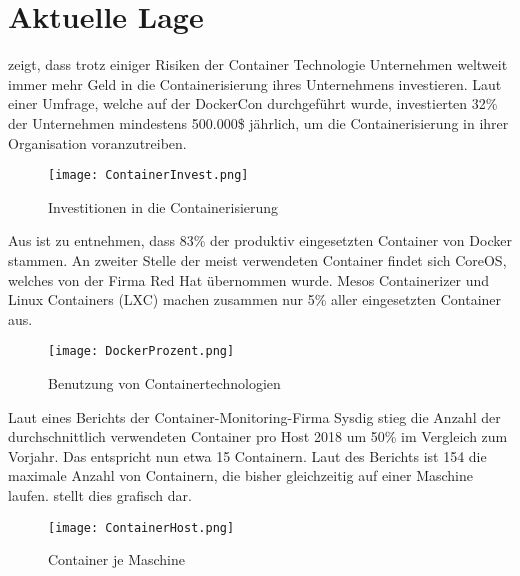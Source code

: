 \section{Aktuelle Lage}
\label{sec:AktuelleLage}
 zeigt, dass trotz einiger Risiken der Container Technologie Unternehmen weltweit immer mehr Geld in die Containerisierung ihres Unternehmens investieren. Laut einer Umfrage, welche auf der DockerCon durchgeführt wurde, investierten 32\% der Unternehmen mindestens 500.000\$ jährlich, um die Containerisierung in ihrer Organisation voranzutreiben. \cite{Investments}
\begin{figure}[H]
	\begin{center}
		\texttt{[image: ContainerInvest.png]}
	\end{center}
	\caption[Investitionen in die Containerisierung]{Investitionen in die Containerisierung \footnotemark}
	\label{fig:Stats1}
\end{figure}
\newpage
Aus  ist zu entnehmen, dass 83\% der produktiv eingesetzten Container von Docker stammen. An zweiter Stelle der meist verwendeten Container findet sich CoreOS, welches von der Firma Red Hat übernommen wurde. Mesos Containerizer und Linux Containers (LXC) machen zusammen nur 5\% aller eingesetzten Container aus.
\begin{figure}[H]
	\begin{center}
		\texttt{[image: DockerProzent.png]}
	\end{center}
	\caption[Benutzung von Containertechnologien]{Benutzung von Containertechnologien \footnotemark}
	\label{fig:Stats2}
\end{figure}
Laut eines Berichts der Container-Monitoring-Firma Sysdig stieg die Anzahl der durchschnittlich verwendeten Container pro Host 2018 um 50\% im Vergleich zum Vorjahr. Das entspricht nun etwa 15 Containern. Laut des Berichts ist 154 die maximale Anzahl von Containern, die bisher gleichzeitig auf einer Maschine laufen.  stellt dies grafisch dar.
\begin{figure}[H]
	\begin{center}
		\texttt{[image: ContainerHost.png]}
	\end{center}
	\caption[Container je Maschine]{Container je Maschine} \footnotemark
	\label{fig:Stats3}
\end{figure}
